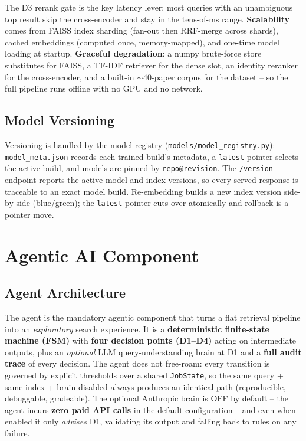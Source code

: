 \documentclass[12pt,a4paper]{article}
\begin{document}
The D3 rerank gate is the key latency lever: most queries with an unambiguous top result skip the cross-encoder and stay in the tens-of-ms range. \textbf{Scalability} comes from FAISS index sharding (fan-out then RRF-merge across shards), cached embeddings (computed once, memory-mapped), and one-time model loading at startup. \textbf{Graceful degradation}: a numpy brute-force store substitutes for FAISS, a TF-IDF retriever for the dense slot, an identity reranker for the cross-encoder, and a built-in $\sim$40-paper corpus for the dataset -- so the full pipeline runs offline with no GPU and no network.

\subsection{Model Versioning}

Versioning is handled by the model registry (\texttt{models/model\_registry.py}): \texttt{model\_meta.json} records each trained build's metadata, a \texttt{latest} pointer selects the active build, and models are pinned by \texttt{repo@revision}. The \texttt{/version} endpoint reports the active model and index versions, so every served response is traceable to an exact model build. Re-embedding builds a new index version side-by-side (blue/green); the \texttt{latest} pointer cuts over atomically and rollback is a pointer move.

\section{Agentic AI Component}

\subsection{Agent Architecture}

The agent is the mandatory agentic component that turns a flat retrieval pipeline into an \emph{exploratory} search experience. It is a \textbf{deterministic finite-state machine (FSM)} with \textbf{four decision points (D1--D4)} acting on intermediate outputs, plus an \emph{optional} LLM query-understanding brain at D1 and a \textbf{full audit trace} of every decision. The agent does not free-roam: every transition is governed by explicit thresholds over a shared \texttt{JobState}, so the same query + same index + brain disabled always produces an identical path (reproducible, debuggable, gradeable). The optional Anthropic brain is OFF by default -- the agent incurs \textbf{zero paid API calls} in the default configuration -- and even when enabled it only \emph{advises} D1, validating its output and falling back to rules on any failure.
\end{document}
